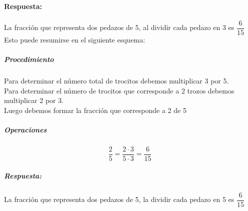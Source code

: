 \documentclass[10pt,twoside]{article}
\begin{document}
\paragraph*{Respuesta:} 
La fracción que representa dos pedazos de 5, al dividir cada pedazo en 3 es $\dfrac{6}{15}$\\
Esto puede resumirse en el siguiente esquema:
\subparagraph*{Procedimiento}
Para determinar el número total de trocitos debemos multiplicar 3 por 5.\\
Para determinar el número de trocitos que corresponde a 2 trozos debemos multiplicar 2 por 3.\\
Luego debemos formar la fracción que corresponde a 2 de 5
\subparagraph*{Operaciones}
\[\dfrac{2}{5}=\dfrac{2\cdot 3}{5\cdot 3}=\dfrac{6}{15}\]
\subparagraph*{Respuesta:}
La fracción que representa dos pedazos de 5, la dividir cada pedazo en 5 es $\dfrac{6}{15}$
\end{document}
